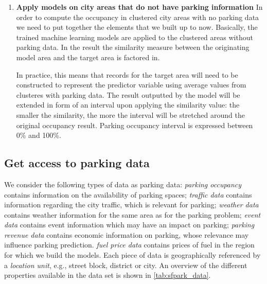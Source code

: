 \documentclass{ws-ijait}
\begin{document}
\begin{enumerate}[label=\Roman*]
		\item{\textbf{Apply models on city areas that do not have parking information}}
		In order to compute the occupancy in clustered city areas with no parking data we need to put together the elements that we built up to now. Basically, the trained machine learning models are applied to the clustered areas without parking data. In the result the similarity measure between the originating model area and the target area is factored in.
		
		In practice, this means that records for the target area will need to be constructed to represent the predictor variable using average values from clusteres with parking data. The result outputted by the model will be extended in form of an interval upon applying the similarity value: the smaller the similarity, the more the interval will be stretched around the original occupancy result. Parking occupancy interval is expressed between 0\% and 100\%.
		
	\end{enumerate}
	
	\subsection{Get access to parking data}
	We consider the following types of data as parking data: \textit{parking occupancy} contains information on the availability of parking spaces; \textit{traffic data} contains information regarding the city traffic, which is relevant for parking; \textit{weather data} contains weather information for the same area as for the parking problem; \textit{event data} contains event information which may have an impact on parking; \textit{parking revenue data} contains economic information on parking, whose relevance may influence parking prediction. \textit{fuel price data} contains prices of fuel in the region for which we build the models.
	Each piece of data is geographically referenced by a \textit{location unit}, e.g., street block, district or city. 
	An overview of the different properties available in the data set is shown in \cref{tab:sfpark_data}.
	
\end{document}
